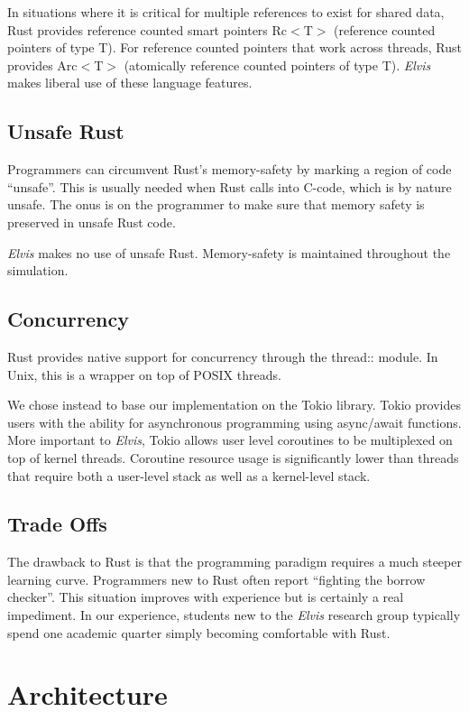 \documentclass[journal]{IEEEtran} %
\newcommand{\elvis}{\textit{Elvis}}
\begin{document}
In situations where it is critical for multiple references to exist for shared data, Rust provides reference counted smart pointers Rc$<$T$>$ (reference counted pointers of type T). For reference counted pointers that work across threads, Rust provides Arc$<$T$>$ (atomically reference counted pointers of type T). \elvis{} makes liberal use of these language features.

\subsection{Unsafe Rust}

Programmers can circumvent Rust's memory-safety by marking a region of code ``unsafe''. This is usually needed when Rust calls into C-code, which is by nature unsafe. The onus is on the programmer to make sure that memory safety is preserved in unsafe Rust code.

\elvis{} makes no use of unsafe Rust. Memory-safety is maintained throughout the simulation. 

\subsection{Concurrency}

Rust provides native support for concurrency through the thread:: module. In Unix, this is a wrapper on top of POSIX threads.

We chose instead to base our implementation on the Tokio \cite{b6} library. Tokio provides users with the ability for asynchronous programming using async/await functions. More important to \elvis{}, Tokio allows user level coroutines to be multiplexed on top of kernel threads.
Coroutine resource usage is significantly lower than threads that require both a 
user-level stack as well as a kernel-level stack.

\subsection{Trade Offs}

The drawback to Rust is that the programming paradigm requires a much steeper learning curve. Programmers new to Rust often report ``fighting the borrow checker''. This situation improves with experience but is certainly a real impediment. In our experience, students new to the \elvis{} research group typically spend one academic quarter simply becoming comfortable 
with Rust.

\section{Architecture}
\end{document}
